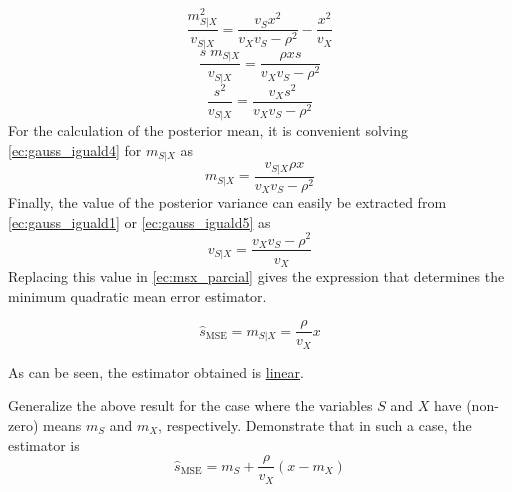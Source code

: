 \begin{equation}
\label{ec:gauss_iguald3}
\frac{m_{S|X}^2}{v_{S|X}} = \displaystyle\frac{v_S x^2}{v_X v_S - \rho^2} - \displaystyle\frac{x^2}{v_X}
\end{equation}
\begin{equation}
\label{ec:gauss_iguald4}
\frac{s\;m_{S|X}}{v_{S|X}} = \displaystyle\frac{\rho x s}{v_X v_S - \rho^2}
\end{equation}
\begin{equation}
\label{ec:gauss_iguald5}
\frac{s^2}{v_{S|X}} = \displaystyle\frac{v_X s^2}{v_X v_S - \rho^2}
\end{equation}
For the calculation of the posterior mean, it is convenient solving \eqref{ec:gauss_iguald4} for $m_{S|X}$ as
\begin{equation}
\label{ec:msx_parcial}
m_{S|X} = \frac{v_{S|X} \rho x}{v_X v_S - \rho^2}
\end{equation}
Finally, the value of the posterior variance can easily be extracted from \eqref{ec:gauss_iguald1} or \eqref{ec:gauss_iguald5} as
\begin{equation}
v_{S|X} = \frac{v_X v_S - \rho^2}{v_X}
\end{equation}
Replacing this value in \eqref{ec:msx_parcial} gives the expression that determines the minimum quadratic mean error estimator.
\begin{framed}
\begin{equation}
\label{ec_estimador_caso_gaussiano_final}
\hat s_{\text{MSE}} = m_{S|X} = \frac{\rho}{v_X} x
\end{equation}
\end{framed}
As can be seen, the estimator obtained is \underline{linear}.

\begin{exercise}
Generalize the above result for the case where the variables $S$ and $X$ have (non-zero) means $m_S$ and $m_X$, respectively. Demonstrate that in such a case, the estimator is
\begin{equation}
\hat s_{\text{MSE}} = m_S + \frac{\rho}{v_X} (x - m_X)
\end{equation}
\end{exercise}

